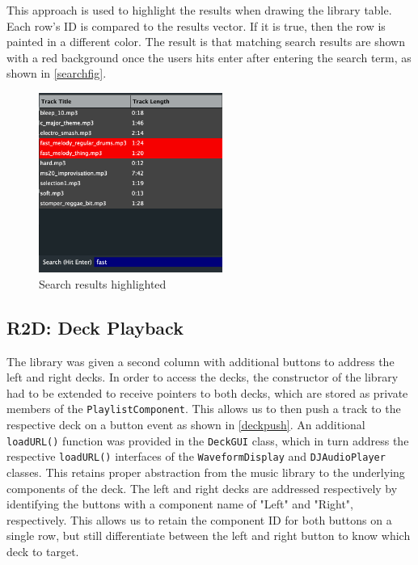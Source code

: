 This approach is used to highlight the results when drawing the library table. Each row's ID is compared to the results vector. If it is true, then the row is painted in a different color. The result is that matching search results are shown with a red background once the users hits enter after entering the search term, as shown in \autoref{searchfig}.

\begin{figure}[H]
	\centering
	\includegraphics[width=6cm]{search.png}
	\caption{Search results highlighted}
	\label{searchfig}
\end{figure}

\subsection{R2D: Deck Playback}
The library was given a second column with additional buttons to address the left and right decks. In order to access the decks, the constructor of the library had to be extended to receive pointers to both decks, which are stored as private members of the \texttt{PlaylistComponent}. This allows us to then push a track to the respective deck on a button event as shown in \autoref{deckpush}. An additional \texttt{loadURL()} function was provided in the \texttt{DeckGUI} class, which in turn address the respective \texttt{loadURL()} interfaces of the \texttt{WaveformDisplay} and \texttt{DJAudioPlayer} classes. This retains proper abstraction from the music library to the underlying components of the deck. The left and right decks are addressed respectively by identifying the buttons with a component name of "Left" and "Right", respectively. This allows us to retain the component ID for both buttons on a single row, but still differentiate between the left and right button to know which deck to target.

